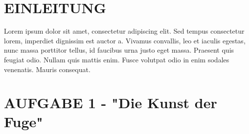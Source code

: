 \documentclass[a4paper,12pt]{article}
\begin{document}
\thispagestyle{empty}
\tableofcontents	
\thispagestyle{empty}




\newpage
\setcounter{page}{4}
\section{EINLEITUNG}



Lorem ipsum dolor sit amet, consectetur adipiscing elit. Sed tempus consectetur lorem, imperdiet dignissim est auctor a. Vivamus convallis, leo et iaculis egestas, nunc massa porttitor tellus, id faucibus urna justo eget massa. Praesent quis feugiat odio. Nullam quis mattis enim. Fusce volutpat odio in enim sodales venenatis. Mauris consequat.


\newpage
\section{AUFGABE 1 - "Die Kunst der Fuge"}
\end{document}
